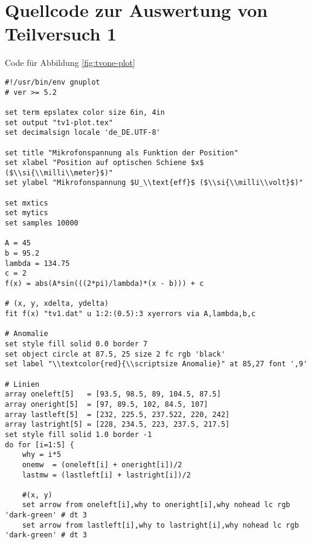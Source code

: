 \section{\gnuplot{} Quellcode zur Auswertung von Teilversuch 1}
	\label{appdx:gnuplotTV1}

	\gnuplot{} Code für Abbildung \ref{fig:tvone-plot}
	{  
        \renewcommand{\fcolorbox}[4][]{#4}
        \begin{verbatim}
#!/usr/bin/env gnuplot
# ver >= 5.2

set term epslatex color size 6in, 4in
set output "tv1-plot.tex"
set decimalsign locale 'de_DE.UTF-8'

set title "Mikrofonspannung als Funktion der Position"
set xlabel "Position auf optischen Schiene $x$ ($\\si{\\milli\\meter}$)"
set ylabel "Mikrofonspannung $U_\\text{eff}$ ($\\si{\\milli\\volt}$)"

set mxtics
set mytics
set samples 10000

A = 45
b = 95.2
lambda = 134.75
c = 2
f(x) = abs(A*sin(((2*pi)/lambda)*(x - b))) + c

# (x, y, xdelta, ydelta)
fit f(x) "tv1.dat" u 1:2:(0.5):3 xyerrors via A,lambda,b,c

# Anomalie
set style fill solid 0.0 border 7
set object circle at 87.5, 25 size 2 fc rgb 'black'
set label "\\textcolor{red}{\\scriptsize Anomalie}" at 85,27 font ',9'

# Linien
array oneleft[5]   = [93.5, 98.5, 89, 104.5, 87.5]
array oneright[5]  = [97, 89.5, 102, 84.5, 107]
array lastleft[5]  = [232, 225.5, 237.522, 220, 242]
array lastright[5] = [228, 234.5, 223, 237.5, 217.5]
set style fill solid 1.0 border -1
do for [i=1:5] {
    why = i*5
    onemw  = (oneleft[i] + oneright[i])/2
    lastmw = (lastleft[i] + lastright[i])/2

    #(x, y)
    set arrow from oneleft[i],why to oneright[i],why nohead lc rgb 'dark-green' # dt 3
    set arrow from lastleft[i],why to lastright[i],why nohead lc rgb 'dark-green' # dt 3


\end{verbatim}}
